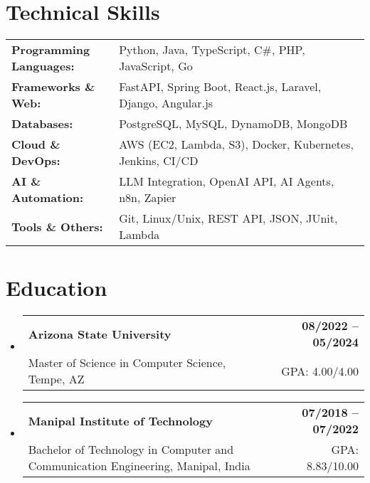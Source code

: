 \documentclass[letterpaper,11pt]{article}
\makeatletter
\newcommand{\educationSubheading}[4]{
  \vspace{-2pt}\item
    \begin{tabular*}{1.0\textwidth}[t]{l@{\extracolsep{\fill}}r}
      \textbf{\small #1} & \textbf{\small #2} \\
      {\small#3} & {\small #4} \\
    \end{tabular*}\vspace{-7pt}
}
\newcommand{\resumeSubHeadingListStart}{\begin{itemize}[leftmargin=0pt, label={}]}
\newcommand{\resumeSubHeadingListEnd}{\end{itemize}}
\makeatother
\begin{document}
\section{Technical Skills}
        \vspace{-14pt}
        \begin{table}[h]
            \footnotesize
            \begin{tabular}{p{0.3\linewidth} p{0.7\linewidth}}
                \textbf{Programming Languages:} & Python, Java, TypeScript, C\#, PHP, JavaScript, Go \\
                \textbf{Frameworks \& Web:} & FastAPI, Spring Boot, React.js, Laravel, Django, Angular.js \\
                \textbf{Databases:} & PostgreSQL, MySQL, DynamoDB, MongoDB \\
                \textbf{Cloud \& DevOps:} & AWS (EC2, Lambda, S3), Docker, Kubernetes, Jenkins, CI/CD \\
                \textbf{AI \& Automation:} & LLM Integration, OpenAI API, AI Agents, n8n, Zapier \\
                \textbf{Tools \& Others:} & Git, Linux/Unix, REST API, JSON, JUnit, Lambda \\
            \end{tabular}
        \end{table}

 \vspace{-15pt}

\section{Education}
  \resumeSubHeadingListStart
    \educationSubheading
      {Arizona State University}{08/2022 -- 05/2024}
      {Master of Science in Computer Science, Tempe, AZ}{GPA: 4.00/4.00}

    \educationSubheading
      {Manipal Institute of Technology}{07/2018 -- 07/2022}
      {Bachelor of Technology in Computer and Communication Engineering, Manipal, India}{GPA: 8.83/10.00}
  \resumeSubHeadingListEnd
\end{document}
